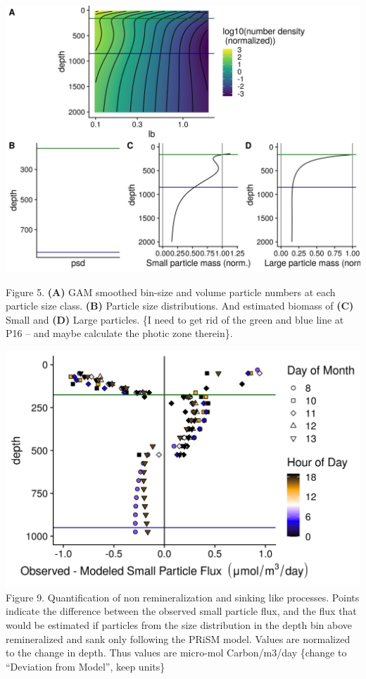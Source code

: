 \documentclass[]{article}
\begin{document}
\includegraphics{../figures/WBModelValidation.png}

Figure 5. \textbf{(A)} GAM smoothed bin-size and volume particle numbers
at each particle size class. \textbf{(B)} Particle size distributions.
And estimated biomass of \textbf{(C)} Small and \textbf{(D)} Large
particles. \{I need to get rid of the green and blue line at P16 -- and
maybe calculate the photic zone therein\}.

\includegraphics{../figures/FluxSizeShift.png} Figure 9. Quantification
of non remineralization and sinking like processes. Points indicate the
difference between the observed small particle flux, and the flux that
would be estimated if particles from the size distribution in the depth
bin above remineralized and sank only following the PRiSM model. Values
are normalized to the change in depth. Thus values are micro-mol
Carbon/m3/day \{change to ``Deviation from Model'', keep units\}
\end{document}
